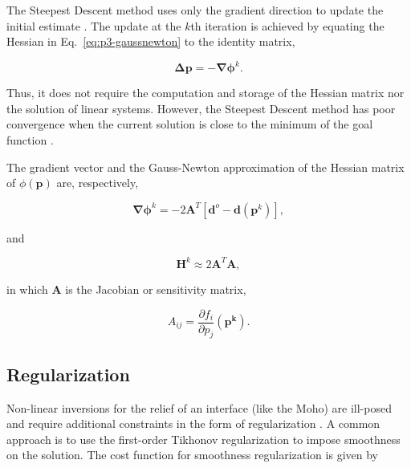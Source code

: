 The Steepest Descent method uses only the gradient direction
to update the initial estimate \citep{kelley1987}.
The update at the $k$th iteration is achieved by equating the Hessian
in Eq.~\ref{eq:p3-gaussnewton} to the identity matrix,

\begin{equation}
    \mathbf{\Delta p} = -\mathbf{\nabla\phi}^k.
    \label{eq:p3-steepest}
\end{equation}

\noindent
Thus, it does not require the computation and storage of the Hessian matrix
nor the solution of linear systems.
However, the Steepest Descent method has poor convergence when the
current solution is close to the minimum of the goal function
\citep{kelley1987}.

The gradient vector and the Gauss-Newton approximation of the Hessian matrix
of $\phi(\mathbf{p})$ are, respectively,

\begin{equation}
    \mathbf{\nabla\phi}^k = -2\mathbf{A}^T[\mathbf{d}^o - \mathbf{d}(\mathbf{p}^k)],
    \label{eq:p3-gradient}
\end{equation}

\noindent
and

\begin{equation}
    \mathbf{H}^k \approx 2\mathbf{A}^T\mathbf{A},
    \label{eq:p3-hessian}
\end{equation}

\noindent in which
$\mathbf{A}$ is the Jacobian or sensitivity matrix,

\begin{equation}
    A_{ij} = \dfrac{\partial f_i}{\partial p_j}(\mathbf{p^k}).
    \label{eq:p3-jacobian}
\end{equation}



\subsection{Regularization}

Non-linear inversions for the relief of an interface (like the Moho)
are ill-posed and require additional constraints in the form of
regularization \citep{silva2001}.
A common approach is to use the first-order Tikhonov regularization to impose
smoothness on the solution.
The cost function for smoothness regularization is given by

